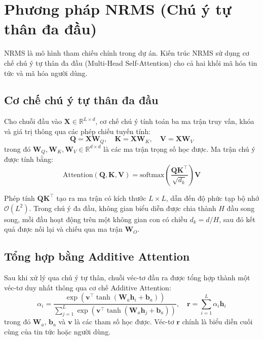 \documentclass[../BTL.tex]{subfiles}
\begin{document}
\section{Phương pháp NRMS (Chú ý tự thân đa đầu)}

NRMS \cite{wu2019nrms} là mô hình tham chiếu chính trong dự án. Kiến trúc NRMS sử dụng cơ chế chú ý tự thân đa đầu (Multi-Head Self-Attention) \cite{vaswani2017attention} cho cả hai khối mã hóa tin tức và mã hóa người dùng.

\subsection{Cơ chế chú ý tự thân đa đầu}

Cho chuỗi đầu vào $\mathbf{X} \in \mathbb{R}^{L \times d}$, cơ chế chú ý tính toán ba ma trận truy vấn, khóa và giá trị thông qua các phép chiếu tuyến tính:
\begin{equation}
    \mathbf{Q} = \mathbf{X}\mathbf{W}_Q, \quad \mathbf{K} = \mathbf{X}\mathbf{W}_K, \quad \mathbf{V} = \mathbf{X}\mathbf{W}_V
\end{equation}
trong đó $\mathbf{W}_Q, \mathbf{W}_K, \mathbf{W}_V \in \mathbb{R}^{d \times d}$ là các ma trận trọng số học được. Ma trận chú ý được tính bằng:
\begin{equation}
    \text{Attention}(\mathbf{Q}, \mathbf{K}, \mathbf{V}) = \text{softmax}\!\left(\frac{\mathbf{Q}\mathbf{K}^{\top}}{\sqrt{d_k}}\right)\mathbf{V}
\end{equation}

Phép tính $\mathbf{Q}\mathbf{K}^{\top}$ tạo ra ma trận có kích thước $L \times L$, dẫn đến độ phức tạp bộ nhớ $\mathcal{O}(L^2)$. Trong chú ý đa đầu, không gian biểu diễn được chia thành $H$ đầu song song, mỗi đầu hoạt động trên một không gian con có chiều $d_k = d/H$, sau đó kết quả được nối lại và chiếu qua ma trận $\mathbf{W}_O$.

\subsection{Tổng hợp bằng Additive Attention}

Sau khi xử lý qua chú ý tự thân, chuỗi véc-tơ đầu ra được tổng hợp thành một véc-tơ duy nhất thông qua cơ chế Additive Attention:
\begin{equation}
    \alpha_i = \frac{\exp\!\left(\mathbf{v}^{\top}\tanh(\mathbf{W}_a \mathbf{h}_i + \mathbf{b}_a)\right)}{\sum_{j=1}^{L} \exp\!\left(\mathbf{v}^{\top}\tanh(\mathbf{W}_a \mathbf{h}_j + \mathbf{b}_a)\right)}, \quad
    \mathbf{r} = \sum_{i=1}^{L} \alpha_i \mathbf{h}_i
\end{equation}
trong đó $\mathbf{W}_a$, $\mathbf{b}_a$ và $\mathbf{v}$ là các tham số học được. Véc-tơ $\mathbf{r}$ chính là biểu diễn cuối cùng của tin tức hoặc người dùng.
\end{document}

